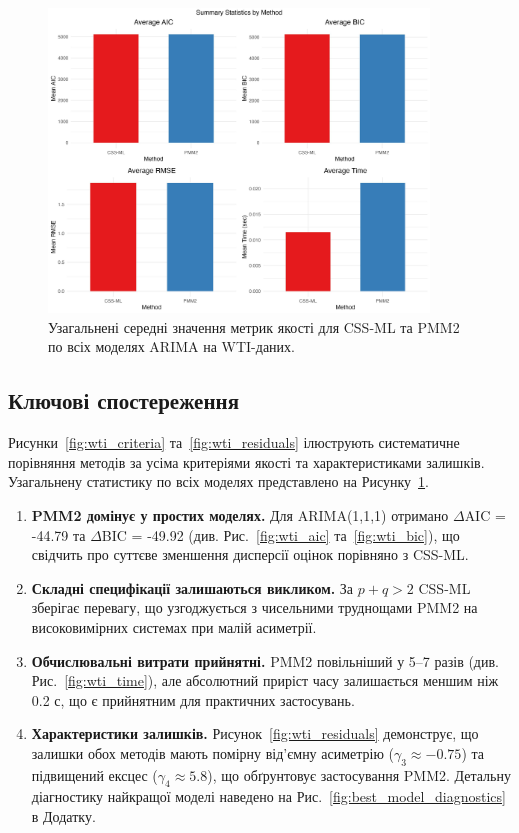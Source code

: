 \documentclass[12pt,a4paper]{article}
\begin{document}
\begin{figure}[htbp]
\centering
\includegraphics[width=0.9\textwidth]{figures/10_summary_statistics.pdf}
\caption{Узагальнені середні значення метрик якості для CSS-ML та PMM2 по всіх моделях ARIMA на WTI-даних.}
\label{fig:wti_summary}
\end{figure}

\subsection{Ключові спостереження}
\label{subsec:wti_key_observations}

Рисунки~\ref{fig:wti_criteria} та~\ref{fig:wti_residuals} ілюструють систематичне порівняння методів за усіма критеріями якості та характеристиками залишків. Узагальнену статистику по всіх моделях представлено на Рисунку~\ref{fig:wti_summary}.

\begin{enumerate}
    \item \textbf{PMM2 домінує у простих моделях.} Для ARIMA(1,1,1) отримано $\Delta$AIC = -44.79 та $\Delta$BIC = -49.92 (див. Рис.~\ref{fig:wti_aic} та~\ref{fig:wti_bic}), що свідчить про суттєве зменшення дисперсії оцінок порівняно з CSS-ML.
    \item \textbf{Складні специфікації залишаються викликом.} За $p+q>2$ CSS-ML зберігає перевагу, що узгоджується з чисельними труднощами PMM2 на високовимірних системах при малій асиметрії.
    \item \textbf{Обчислювальні витрати прийнятні.} PMM2 повільніший у 5--7 разів (див. Рис.~\ref{fig:wti_time}), але абсолютний приріст часу залишається меншим ніж 0.2 с, що є прийнятним для практичних застосувань.
    \item \textbf{Характеристики залишків.} Рисунок~\ref{fig:wti_residuals} демонструє, що залишки обох методів мають помірну від'ємну асиметрію ($\gamma_3 \approx -0.75$) та підвищений ексцес ($\gamma_4 \approx 5.8$), що обґрунтовує застосування PMM2. Детальну діагностику найкращої моделі наведено на Рис.~\ref{fig:best_model_diagnostics} в Додатку.
\end{enumerate}
\end{document}
